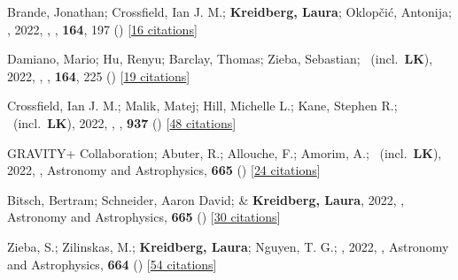 \item[{\color{numcolor}\scriptsize72}] Brande, Jonathan; Crossfield, Ian J. M.; \textbf{Kreidberg, Laura}; Oklop{\v{c}}i{\'c}, Antonija; \etal, 2022, , \aj, \textbf{164}, 197 () [\href{https://ui.adsabs.harvard.edu/abs/2022AJ....164..197B}{16 citations}]

\item[{\color{numcolor}\scriptsize71}] Damiano, Mario; Hu, Renyu; Barclay, Thomas; Zieba, Sebastian; \etal\ (incl.\ \textbf{LK}), 2022, , \aj, \textbf{164}, 225 () [\href{https://ui.adsabs.harvard.edu/abs/2022AJ....164..225D}{19 citations}]

\item[{\color{numcolor}\scriptsize70}] Crossfield, Ian J. M.; Malik, Matej; Hill, Michelle L.; Kane, Stephen R.; \etal\ (incl.\ \textbf{LK}), 2022, , \apj, \textbf{937} () [\href{https://ui.adsabs.harvard.edu/abs/2022ApJ...937L..17C}{48 citations}]

\item[{\color{numcolor}\scriptsize69}] GRAVITY+ Collaboration; Abuter, R.; Allouche, F.; Amorim, A.; \etal\ (incl.\ \textbf{LK}), 2022, , Astronomy and Astrophysics, \textbf{665} () [\href{https://ui.adsabs.harvard.edu/abs/2022A&A...665A..75G}{24 citations}]

\item[{\color{numcolor}\scriptsize68}] Bitsch, Bertram; Schneider, Aaron David; \& \textbf{Kreidberg, Laura}, 2022, , Astronomy and Astrophysics, \textbf{665} () [\href{https://ui.adsabs.harvard.edu/abs/2022A&A...665A.138B}{30 citations}]

\item[{\color{numcolor}\scriptsize67}] Zieba, S.; Zilinskas, M.; \textbf{Kreidberg, Laura}; Nguyen, T. G.; \etal, 2022, , Astronomy and Astrophysics, \textbf{664} () [\href{https://ui.adsabs.harvard.edu/abs/2022A&A...664A..79Z}{54 citations}]

